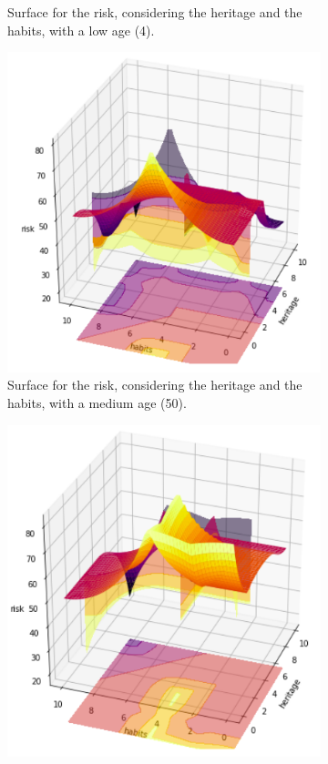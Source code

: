 \begin{figure}[ht]
\begin{subfigure}{.3\textwidth}
  \caption{Surface for the risk, considering the heritage and the habits, with a low age (4).}
  \label{fig:sur4}
\end{subfigure}
\begin{subfigure}{.3\textwidth}
  \centering
  \includegraphics[width=.8\linewidth]{figures/heritage-habits50.png}  
  \caption{Surface for the risk, considering the heritage and the habits, with a medium age (50).}
  \label{fig:sur5}
\end{subfigure}
\begin{subfigure}{.3\textwidth}
  \centering
  \includegraphics[width=.8\linewidth]{figures/heritage-habits90.png}  

\end{subfigure}
\end{figure}

